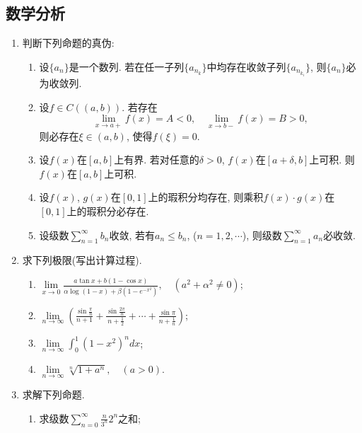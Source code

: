 \documentclass[12pt,a4paper,openany]{book}
\begin{document}
\subsection{数学分析}
\begin{enumerate}
\item 判断下列命题的真伪:
\begin{enumerate}
\item 设$\{a_n\}$是一个数列. 若在任一子列$\{a_{n_k}\}$中均存在收敛子列$\{a_{n_{k_i}}\}$, 则$\{a_n\}$必为收敛列.

\item 设$f \in C((a, b))$. 若存在
\[
\lim_{x \rightarrow a+}{f(x)} = A < 0, \quad \lim_{x \rightarrow b-}{f(x)} = B > 0,
\]
则必存在$\xi \in (a, b)$, 使得$f(\xi) = 0$.

\item 设$f(x)$在$[a, b]$上有界. 若对任意的$\delta > 0$, $f(x)$在$[a + \delta, b]$上可积. 则$f(x)$在$[a, b]$上可积.

\item 设$f(x)$, $g(x)$在$[0, 1]$上的瑕积分均存在, 则乘积$f(x) \cdot g(x)$在$[0, 1]$上的瑕积分必存在.

\item 设级数$\sum\limits_{n=1}^{\infty}{b_n}$收敛, 若有$a_n \le b_n$, ($n = 1, 2, \cdots$), 则级数$\sum\limits_{n=1}^{\infty}{a_n}$必收敛.
\end{enumerate}

\item 求下列极限(写出计算过程).
\begin{enumerate}
\item $\lim\limits_{x \rightarrow 0}{\displaystyle\frac{a\tan{x} + b(1 - \cos{x})}{\alpha\log(1 - x) + \beta(1 - e^{-x^2})}}, \quad (a^2 + \alpha^2 \neq 0)$;

\item $\lim\limits_{n \rightarrow \infty}{(\displaystyle\frac{\sin\frac{\pi}{n}}{n + 1} + \frac{\sin\frac{2\pi}{n}}{n + \frac{1}{2}} + \cdots + \frac{\sin\pi}{n + \frac{1}{n}})}$;

\item $\lim\limits_{n \rightarrow \infty}{\displaystyle\int_{0}^{1}{(1 - x^2)^ndx}}$;

\item $\lim\limits_{n \rightarrow \infty}{\sqrt[n]{1 + a^n}}, \quad (a > 0)$.
\end{enumerate}

\item 求解下列命题.
\begin{enumerate}
\item 求级数$\displaystyle\sum\limits_{n=0}^{\infty}{\frac{n}{3^n}2^n}$之和;


\end{enumerate}
\end{enumerate}
\end{document}
